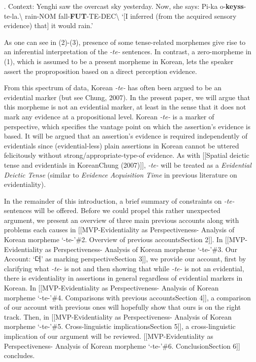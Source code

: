 \ex. Context: Yenghi saw the overcast sky yesterday. Now, she says:
\gll Pi-ka o-\textbf{keyss}-te-la.\textbackslash{} rain-NOM
fall-\textbf{FUT}-TE-DEC\textbackslash{} `{[}I inferred (from the
acquired sensory evidence) that{]} it would rain.'

As one can see in (2)-(3), presence of some tense-related morphemes give
rise to an inferential interpretation of the \emph{-te-} sentences. In
contrast, a zero-morpheme in (1), which is assumed to be a present
morpheme in Korean, lets the speaker assert the proproposition based on
a direct perception evidence.

From this spectrum of data, Korean \emph{-te-} has often been argued to
be an evidential marker (but see Chung, 2007). In the present paper, we
will argue that this morpheme is not an evidential marker, at least in
the sense that it does not mark any evidence at a propositional level.
Korean \emph{-te-} is a marker of perspective, which specifies the
vantage point on which the assertion's evidence is based. It will be
argued that an assertion's evidence is required independently of
evidentials since (evidential-less) plain assertions in Korean cannot be
uttered felicitously without strong/appropriate-type-of evidence. As
with {[}{[}Spatial deictic tense and evidentials in Korean\textbar Chung
(2007){]}{]}, \emph{-te-} will be treated as a \emph{Evidential Deictic
Tense} (similar to \emph{Evidence Acquisition Time} in previous
literature on evidentiality).

In the remainder of this introduction, a brief summary of constraints on
\emph{-te-} sentences will be offered. Before we could propel this
rather unexpected argument, we present an overview of three main
previous accounts along with problems each causes in
{[}{[}MVP-Evidentiality as Perspectiveness- Analysis of Korean morpheme
`-te-'\#2. Overview of previous accounts\textbar Section 2{]}{]}. In
{[}{[}MVP-Evidentiality as Perspectiveness- Analysis of Korean morpheme
`-te-'\#3. Our Account: `더' as marking perspective\textbar Section
3{]}{]}, we provide our account, first by clarifying what \emph{-te-} is
not and then showing that while \emph{-te-} is not an evidential, there
is evidentiality in assertions in general regardless of evidential
markers in Korean. In {[}{[}MVP-Evidentiality as Perspectiveness-
Analysis of Korean morpheme `-te-'\#4. Comparisons with previous
accounts\textbar Section 4{]}{]}, a comparison of our account with
previous ones will hopefully show that ours is on the right track. Then,
in {[}{[}MVP-Evidentiality as Perspectiveness- Analysis of Korean
morpheme `-te-'\#5. Cross-linguistic implications\textbar Section
5{]}{]}, a cross-linguistic implication of our argument will be
reviewed. {[}{[}MVP-Evidentiality as Perspectiveness- Analysis of Korean
morpheme `-te-'\#6. Conclusion\textbar Section 6{]}{]} concludes.

